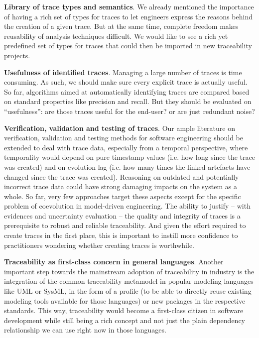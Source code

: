 \textbf{Library of trace types and semantics}. We already mentioned the importance of having a rich set of types for traces to let engineers express the reasons behind the creation of a given trace. But at the same time, complete freedom makes reusability of analysis techniques difficult. We would like to see a rich yet predefined set of types for traces that could then be imported in new traceability projects.

\textbf{Usefulness of identified traces}. Managing a large number of traces is time consuming. As such, we should make sure every explicit trace is actually useful. So far, algorithms aimed at automatically identifying traces are compared based on standard properties like precision and recall. But they should be evaluated on ``usefulness'': are those traces useful for the end-user? or are just redundant noise? 

\textbf{Verification, validation and testing of traces}. Our ample literature on verification, validation and testing methods for software engineering should be extended to deal with trace data, especially from a temporal perspective, where temporality would depend on pure timestamp values (i.e. how long since the trace was created) and on evolution lag (i.e. how many times the linked artefacts have changed since the trace was created). Reasoning on outdated and potentially incorrect trace data could have strong damaging impacts on the system as a whole. So far, very few approaches target these aspects except for the specific  problem of coevolution in model-driven engineering. 
The ability to justify – with evidences and uncertainty evaluation – the quality and integrity of traces is a prerequisite to robust and reliable traceability. And given the effort required to create traces in the first place, this is important to instill more confidence to practitioners wondering whether creating traces is worthwhile.

\textbf{Traceability as first-class concern in general languages}. Another important step towards the mainstream adoption of traceability in industry is the integration of the common traceability metamodel in popular modeling languages like UML or SysML, in the form of a profile (to be able to directly reuse existing modeling tools available for those languages) or new packages in the respective standards. This way, traceability would become a first-class citizen in software development while still being a rich concept and not just the plain dependency relationship we can use right now in those languages. 

